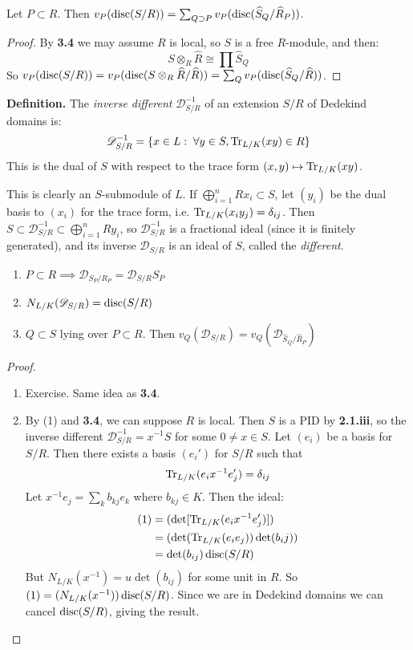\documentclass[10pt,a4paper]{article}
\begin{document}
\begin{proposition}
  Let $P \subset R$. Then $v_P(\operatorname{disc}(S/R)) = \sum_{Q\supset P}v_P(\operatorname{disc}(\widehat{S}_Q/\widehat{R}_P))$.
\end{proposition}
\begin{proof}
  By \textbf{3.4} we may assume $R$ is local, so $S$ is a free $R$-module, and then:
  \[S\otimes_R \hat{R} \cong \prod \hat{S}_Q\]
  So $v_P(\operatorname{disc}(S/R)) = v_P(\operatorname{disc}(S\otimes_R \widehat{R}/\widehat{R})) = \sum_Q v_P(\operatorname{disc}(\widehat{S}_Q/\widehat{R}))$.
\end{proof}
\textbf{Definition.} The \emph{inverse different} $\mathscr{D}_{S/R}^{-1}$ of an extension $S/R$ of Dedekind domains is:
\[\mathscr{D}_{S/R}^{-1} = \{x \in L : \forall y \in S, \Tr_{L/K}(xy) \in R\}\]
This is the dual of $S$ with respect to the trace form $(x,y) \mapsto \operatorname{Tr}_{L/K}(xy)$.

This is clearly an $S$-submodule of $L$. If $\bigoplus_{i=1}^n Rx_i \subset S$, let $(y_i)$ be the dual basis to $(x_i)$ for the trace form, i.e. $\operatorname{Tr}_{L/K}(x_iy_j) = \delta_{ij}$. Then $S \subset \mathscr{D}_{S/R}^{-1} \subset \bigoplus_{i=1}^n Ry_i$, so $\mathscr{D}_{S/R}^{-1}$ is a fractional ideal (since it is finitely generated), and its inverse $\mathscr{D}_{S/R}$ is an ideal of $S$, called the \emph{different}.
\begin{proposition}\hspace*{0cm}
  \begin{enumerate}
    \item $P\subset R \implies \mathscr{D}_{S_P/R_P} = \mathscr{D}_{S/R}S_P$
    \item $N_{L/K}(\mathscr{D}_{S/R}) = \operatorname{disc}(S/R)$
    \item $Q \subset S$ lying over $P\subset R$. Then $v_Q(\mathscr{D}_{S/R}) = v_Q(\mathscr{D}_{\hat{S}_Q/\hat{R}_P})$
  \end{enumerate}
\end{proposition}
\begin{proof}\hspace*{0cm}
  \begin{enumerate}
    \item Exercise. Same idea as \textbf{3.4}.
    \item By (1) and \textbf{3.4}, we can suppose $R$ is local. Then $S$ is a PID by \textbf{2.1.iii}, so the inverse different $\mathscr{D}^{-1}_{S/R} = x^{-1} S$ for some $0 \neq x \in S$. Let $(e_i)$ be a basis for $S/R$. Then there exists a basis $(e_i')$ for $S/R$ such that
    \[\operatorname{Tr}_{L/K}(e_i x^{-1} e'_j) = \delta_{ij}\]
    Let $x^{-1}e_j = \sum_{k} b_{kj}e_k$ where $b_{kj} \in K$. Then the ideal:
    \begin{align*}
      (1) &= (\det[\operatorname{Tr}_{L/K}(e_ix^{-1}e_j')]) \\
      &= (\det (\operatorname{Tr}_{L/K}(e_ie_j))\det(b_ij)) \\
      &= \det(b_{ij}) \operatorname{disc}(S/R)
    \end{align*}
    But $N_{L/K}(x^{-1}) = u \det(b_{ij})$ for some unit in $R$. So $(1) = (N_{L/K}(x^{-1}))\operatorname{disc}(S/R)$. Since we are in Dedekind domains we can cancel $\operatorname{disc}(S/R)$, giving the result.
  \end{enumerate}
\end{proof}
\end{document}
